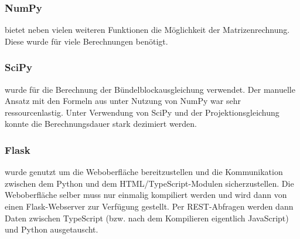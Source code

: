 \documentclass[./00PhotoBox.tex]{subfiles}
\begin{document}
\subsubsection{NumPy}
bietet neben vielen weiteren Funktionen die Möglichkeit der Matrizenrechnung. Diese wurde für viele Berechnungen benötigt.

\subsubsection{SciPy}
wurde für die Berechnung der Bündelblockausgleichung verwendet. Der manuelle Ansatz mit den Formeln aus \cite{luhmann} unter Nutzung von NumPy war sehr ressourcenlastig. Unter Verwendung von SciPy und der Projektionsgleichung konnte die Berechnungsdauer stark dezimiert werden.

\subsubsection{Flask}
wurde genutzt um die Weboberfläche bereitzustellen und die Kommunikation zwischen dem Python und dem HTML/TypeScript-Modulen sicherzustellen. Die Weboberfläche selber muss nur einmalig kompiliert werden und wird dann von einen Flask-Webserver zur Verfügung gestellt. Per REST-Abfragen werden dann Daten zwischen TypeScript (bzw. nach dem Kompilieren eigentlich JavaScript) und Python ausgetauscht.


\biblio
\end{document}

